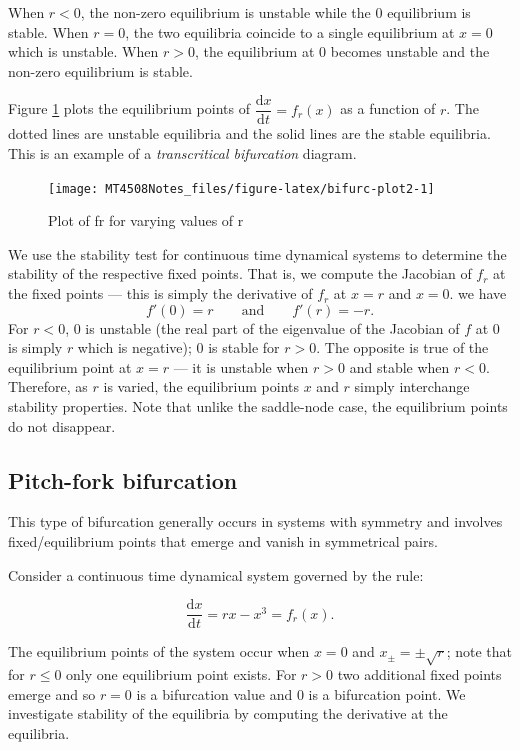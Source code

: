 \documentclass[
  a4paper,
  oneside,
  final]{krantz}
\renewcommand{\d}{\mathrm{d}}
\newcommand{\der}[2]{\dfrac{\d #1}{\d #2}}
\theoremstyle{definition}
\theoremstyle{definition}
\theoremstyle{definition}
\theoremstyle{definition}
\theoremstyle{remark}
\begin{document}
When \(r<0\), the non-zero equilibrium is unstable while the \(0\)
equilibrium is stable. When \(r =0\), the two equilibria coincide to a
single equilibrium at \(x=0\) which is unstable. When \(r>0\), the equilibrium at \(0\) becomes unstable and the
non-zero equilibrium is stable.

Figure \ref{fig:bifurc-plot2} plots the equilibrium points of
\(\der{x}{t} = f_{r}(x)\) as a function of \(r\). The dotted lines are
unstable equilibria and the solid lines are the stable equilibria. This
is an example of a \emph{transcritical bifurcation} diagram.

\begin{figure}

{\centering \texttt{[image: MT4508Notes\_files/figure-latex/bifurc-plot2-1]} 

}

\caption{Plot of fr for varying values of r}\label{fig:bifurc-plot2}
\end{figure}

We use the stability test for continuous time dynamical systems to
determine the stability of the respective fixed points. That is, we
compute the Jacobian of \(f_{r}\) at the fixed points --- this is simply
the derivative of \(f_{r}\) at \(x=r\) and \(x=0\). we have
\[ f'(0) =r \qquad \text{and} \qquad f'(r) = -r.\] For \(r<0\), \(0\) is
unstable (the real part of the eigenvalue of the Jacobian of \(f\) at \(0\)
is simply \(r\) which is negative); \(0\) is stable for \(r>0\). The opposite
is true of the equilibrium point at \(x=r\) --- it is unstable when \(r>0\)
and stable when \(r<0\). Therefore, as \(r\) is varied, the equilibrium
points \(x\) and \(r\) simply interchange stability properties. Note that
unlike the saddle-node case, the equilibrium points do not disappear.

\hypertarget{pitch-fork-bifurcation}{%
\subsection*{Pitch-fork bifurcation}\label{pitch-fork-bifurcation}}


This type of bifurcation generally occurs in systems with symmetry and
involves fixed/equilibrium points that emerge and vanish in symmetrical
pairs.

Consider a continuous time dynamical system governed by the rule:

\[
\der{x}{t} = rx - x^3 = f_{r}(x).
\]

The equilibrium points of the system occur when \(x=0\) and
\(x_{\pm} = \pm \sqrt{r}\); note that for \(r\le0\) only one equilibrium point
exists. For \(r>0\) two additional fixed points emerge and so \(r=0\) is a
bifurcation value and \(0\) is a bifurcation point. We investigate stability of the equilibria by
computing the derivative at the equilibria.
\end{document}
